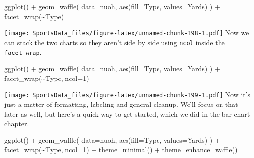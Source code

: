 \documentclass[
]{book}
\newenvironment{Shaded}{\begin{snugshade}}{\end{snugshade}}
\newcommand{\AttributeTok}[1]{\textcolor[rgb]{0.77,0.63,0.00}{#1}}
\newcommand{\DecValTok}[1]{\textcolor[rgb]{0.00,0.00,0.81}{#1}}
\newcommand{\FunctionTok}[1]{\textcolor[rgb]{0.00,0.00,0.00}{#1}}
\newcommand{\NormalTok}[1]{#1}
\newcommand{\SpecialCharTok}[1]{\textcolor[rgb]{0.00,0.00,0.00}{#1}}
\begin{document}
\begin{Shaded}
\begin{Highlighting}[]
\FunctionTok{ggplot}\NormalTok{() }\SpecialCharTok{+} \FunctionTok{geom\_waffle}\NormalTok{(}
  \AttributeTok{data=}\NormalTok{nuoh,}
  \FunctionTok{aes}\NormalTok{(}\AttributeTok{fill=}\NormalTok{Type, }\AttributeTok{values=}\NormalTok{Yards)}
\NormalTok{) }\SpecialCharTok{+} \FunctionTok{facet\_wrap}\NormalTok{(}\SpecialCharTok{\textasciitilde{}}\NormalTok{Type)}
\end{Highlighting}
\end{Shaded}

\texttt{[image: SportsData\_files/figure-latex/unnamed-chunk-198-1.pdf]}
Now we can stack the two charts so they aren't side by side using \texttt{ncol} inside the \texttt{facet\_wrap}.

\begin{Shaded}
\begin{Highlighting}[]
\FunctionTok{ggplot}\NormalTok{() }\SpecialCharTok{+} \FunctionTok{geom\_waffle}\NormalTok{(}
  \AttributeTok{data=}\NormalTok{nuoh,}
  \FunctionTok{aes}\NormalTok{(}\AttributeTok{fill=}\NormalTok{Type, }\AttributeTok{values=}\NormalTok{Yards)}
\NormalTok{) }\SpecialCharTok{+} \FunctionTok{facet\_wrap}\NormalTok{(}\SpecialCharTok{\textasciitilde{}}\NormalTok{Type, }\AttributeTok{ncol=}\DecValTok{1}\NormalTok{)}
\end{Highlighting}
\end{Shaded}

\texttt{[image: SportsData\_files/figure-latex/unnamed-chunk-199-1.pdf]}
Now it's just a matter of formatting, labeling and general cleanup. We'll focus on that later as well, but here's a quick way to get started, which we did in the bar chart chapter.

\begin{Shaded}
\begin{Highlighting}[]
\FunctionTok{ggplot}\NormalTok{() }\SpecialCharTok{+} \FunctionTok{geom\_waffle}\NormalTok{(}
  \AttributeTok{data=}\NormalTok{nuoh,}
  \FunctionTok{aes}\NormalTok{(}\AttributeTok{fill=}\NormalTok{Type, }\AttributeTok{values=}\NormalTok{Yards)}
\NormalTok{) }\SpecialCharTok{+}  
    \FunctionTok{facet\_wrap}\NormalTok{(}\SpecialCharTok{\textasciitilde{}}\NormalTok{Type, }\AttributeTok{ncol=}\DecValTok{1}\NormalTok{) }\SpecialCharTok{+} 
    \FunctionTok{theme\_minimal}\NormalTok{() }\SpecialCharTok{+} 
    \FunctionTok{theme\_enhance\_waffle}\NormalTok{()}
\end{Highlighting}
\end{Shaded}
\end{document}
